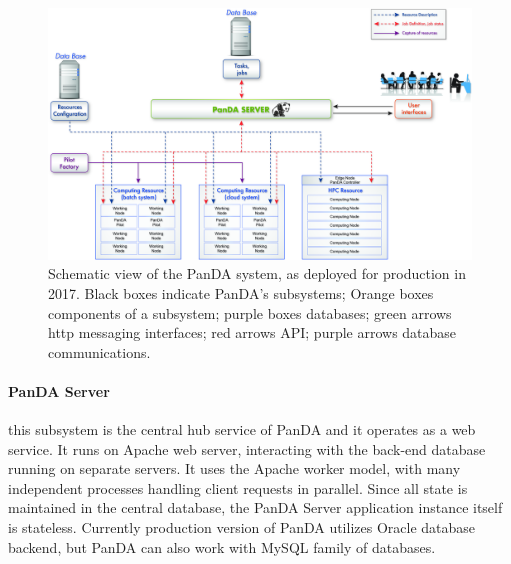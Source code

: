 \begin{figure}
  \begin{center}
    \includegraphics[width=\columnwidth]{figures/PandaArch.jpg}
  \end{center}
\caption{Schematic view of
the PanDA system\label{fig:architecture}, as deployed for production in 2017.
Black boxes indicate PanDA's subsystems; Orange boxes components of a subsystem;
purple boxes databases; green arrows http messaging interfaces; red arrows API;
purple arrows database communications.}
\end{figure}

\paragraph{\textbf{PanDA Server}} this subsystem is the central hub service of
PanDA and it operates as a web service. It runs on Apache web server,
interacting with the back-end database running on separate servers. It uses the
Apache worker model, with many independent  processes handling client requests
in parallel. Since all state is maintained in the central database, the PanDA
Server application instance itself is stateless. Currently production version of
PanDA utilizes Oracle database backend, but PanDA can also work with MySQL
family of databases.


